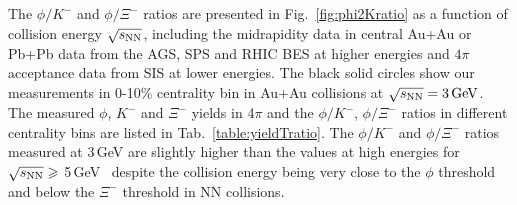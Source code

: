 \documentclass[%
 reprint,	
showpacs,
 amsmath,amssymb,
 aps,
 superscriptaddress,
]{revtex4-1}
\begin{document}
The $\phi/K^-$ and $\phi/\Xi^-$ ratios are presented in Fig.~\ref{fig:phi2Kratio} as a function of collision energy $\sqrt{s_{\rm NN}}$, including the midrapidity data in central Au+Au or Pb+Pb data from the AGS, SPS and RHIC BES at higher energies and $4\pi$\,acceptance data from SIS at lower energies. The black solid circles show our measurements in 0-10\% centrality bin in Au+Au collisions at ${\sqrt{s_{\rm NN}} = \rm{3\,GeV}}$. The measured $\phi$, $K^-$ and $\Xi^-$ yields in 4$\pi$ and the $\phi/K^-$, $\phi/\Xi^-$ ratios in different centrality bins are listed in Tab.~\ref{table:yieldTratio}. The $\phi/K^-$ and $\phi/\Xi^-$ ratios measured at 3\,GeV are %
slightly higher than the values at high energies for $\sqrt{s_{\rm NN}}\geqslant$ 5\,GeV~\cite{NA49_phi,NA49_piK,NA49_piK2,NA49_Xi,E917_phi,ALICE_phi_2p7TeV,STAR_phi_64a200GeV,Xi_ArKCl_HADES,star_bes_strangeness} despite the collision energy being very close to the $\phi$ threshold and below the $\Xi^-$ threshold in NN collisions. %
\end{document}
